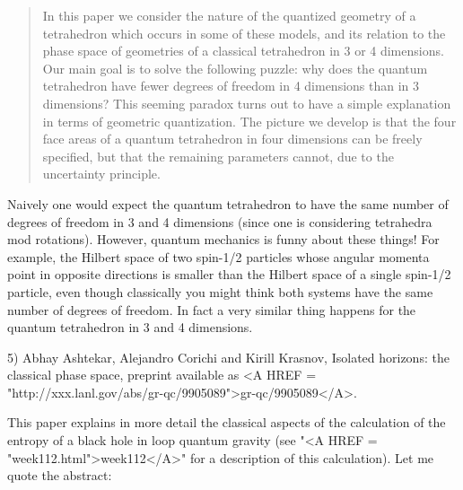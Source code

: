\begin{quote}
In this paper we consider the nature of the quantized geometry of a
tetrahedron which occurs in some of these models, and its relation to
the phase space of geometries of a classical tetrahedron in 3 or 4
dimensions.  Our main goal is to solve the following puzzle: why does
the quantum tetrahedron have fewer degrees of freedom in 4 dimensions
than in 3 dimensions?  This seeming paradox turns out to have a simple
explanation in terms of geometric quantization. The picture we develop 
is that the four face areas of a quantum tetrahedron in four dimensions 
can be freely specified, but that the remaining parameters cannot, due
to the uncertainty principle.
\end{quote}
    

Naively one would expect the quantum tetrahedron to have the same number
of degrees of freedom in 3 and 4 dimensions (since one is considering
tetrahedra mod rotations).  However, quantum mechanics is funny about
these things!  For example, the Hilbert space of two spin-1/2 particles
whose angular momenta point in opposite directions is smaller than the
Hilbert space of a single spin-1/2 particle, even though classically you
might think both systems have the same number of degrees of freedom.  
In fact a very similar thing happens for the quantum tetrahedron in 3
and 4 dimensions.

5) Abhay Ashtekar, Alejandro Corichi and Kirill Krasnov, Isolated horizons:
the classical phase space, preprint available as <A HREF =
"http://xxx.lanl.gov/abs/gr-qc/9905089">gr-qc/9905089</A>.


 This paper explains in more detail the classical aspects of the
calculation of the entropy of a black hole in loop quantum gravity (see
"<A HREF = "week112.html">week112</A>" for a description of
this calculation).  Let me quote the abstract:

